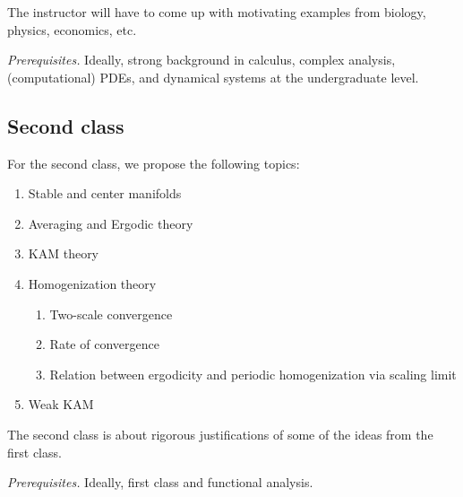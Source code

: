 \documentclass[12pt]{amsart}
\begin{document}
The instructor will have to come up with motivating examples from biology, physics,
economics, etc.

\emph{Prerequisites.} Ideally, strong background in calculus, complex analysis, (computational) PDEs,
and dynamical systems at the undergraduate level. 

\subsection*{Second class}
For the second class, we propose the following topics:
\begin{enumerate}
    \item Stable and center manifolds
    \item Averaging and Ergodic theory
    \item KAM theory
    \item Homogenization theory
        \begin{enumerate}
            \item Two-scale convergence
            \item Rate of convergence
            \item Relation between ergodicity and periodic homogenization via scaling limit
        \end{enumerate}
    \item Weak KAM
\end{enumerate}
The second class is about rigorous justifications of some of the ideas from
the first class.

\emph{Prerequisites.} Ideally, first class and functional analysis.



\printbibliography 
%
%
\end{document}
